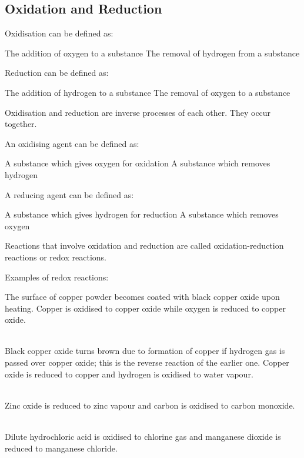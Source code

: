 \subsection{Oxidation and Reduction}

\begin{outline}
   
    \1 Oxidisation can be defined as:

    \2 The addition of oxygen to a substance
    \2 The removal of hydrogen from a substance

    \1 Reduction can be defined as:

    \2 The addition of hydrogen to a substance
    \2 The removal of oxygen to a substance

    \1 Oxidisation and reduction are inverse processes of each other. They occur together.

    \1 An oxidising agent can be defined as:

    \2 A substance which gives oxygen for oxidation
    \2 A substance which removes hydrogen

    \1 A reducing agent can be defined as:

    \2 A substance which gives hydrogen for reduction
    \2 A substance which removes oxygen
    
    \1 Reactions that involve oxidation and reduction are called oxidation-reduction reactions or redox reactions.

    \1 Examples of redox reactions:

    \2 
    The surface of copper powder becomes coated with black copper oxide upon heating. Copper is oxidised to copper oxide while oxygen is reduced to copper oxide.

    \2 \\
    Black copper oxide turns brown due to formation of copper if hydrogen gas is passed over copper oxide; this is the reverse reaction of the earlier one. Copper oxide is reduced to copper and hydrogen is oxidised to water vapour.

    \2 \\
    Zinc oxide is reduced to zinc vapour and carbon is oxidised to carbon monoxide.

    \2 \\
    Dilute hydrochloric acid is oxidised to chlorine gas and manganese dioxide is reduced to manganese chloride.

\end{outline}

